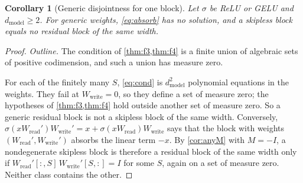 \documentclass[10pt]{article}
\newtheorem{corollary}[theorem]{Corollary}
\theoremstyle{definition}
\theoremstyle{remark}
\newcommand{\Wread}{W_{\mathrm{read}}}
\newcommand{\Wwrite}{W_{\mathrm{write}}}
\newcommand{\dm}{d_{\mathrm{model}}}
\begin{document}
\begin{corollary}[Generic disjointness for one block]\label{cor:f5}
Let $\sigma$ be ReLU or GELU and $\dm \ge 2$. For generic weights, \eqref{eq:absorb} has no solution, and a skipless block equals no residual block of the same width.
\end{corollary}
\begin{proof}
\emph{Outline.} The condition of \cref{thm:f3,thm:f4} is a finite union of algebraic sets of positive codimension, and such a union has measure zero.

For each of the finitely many $S$, \eqref{eq:cond} is $\dm^2$ polynomial equations in the weights. They fail at $\Wwrite = 0$, so they define a set of measure zero; the hypotheses of \cref{thm:f3,thm:f4} hold outside another set of measure zero. So a generic residual block is not a skipless block of the same width. Conversely, $\sigma(x\Wread')\Wwrite' = x + \sigma(x\Wread)\Wwrite$ says that the block with weights $(\Wread', \Wwrite')$ absorbs the linear term $-x$. By \cref{cor:anyM} with $M = -I$, a nondegenerate skipless block is therefore a residual block of the same width only if $\Wread'[{:},S]\,\Wwrite'[S,{:}] = I$ for some $S$, again on a set of measure zero. Neither class contains the other.
\end{proof}
\end{document}
